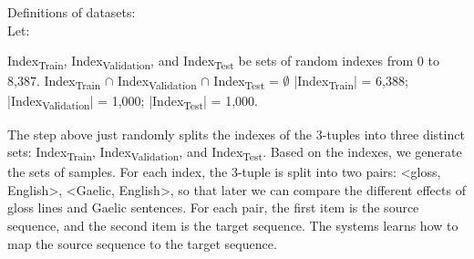 \documentclass[a4paper]{article}
\begin{document}
\begin{exe}
\ex Definitions of datasets:\\
	Let:
	\begin{xlist}
	\ex 	Index\textsubscript{Train}, Index\textsubscript{Validation}, and Index\textsubscript{Test} be sets of random indexes from 0 to 8,387.
    \ex		Index\textsubscript{Train} $\cap$ Index\textsubscript{Validation} $\cap$ Index\textsubscript{Test} = $\emptyset$ 
    \ex 	|Index\textsubscript{Train}| = 6,388; |Index\textsubscript{Validation}| = 1,000; |Index\textsubscript{Test}| = 1,000. 
    \end{xlist}
\end{exe}
The step above just randomly splits the indexes of the 3-tuples into three distinct sets: Index\textsubscript{Train}, Index\textsubscript{Validation}, and Index\textsubscript{Test}. Based on the indexes, we generate the sets of samples. For each index, the 3-tuple is split into two pairs: <gloss, English>, <Gaelic, English>, so that later we can compare the different effects of gloss lines and Gaelic sentences. For each pair, the first item is the source sequence, and the second item is the target sequence. The systems learns how to map the source sequence to the target sequence.    
\end{document}
